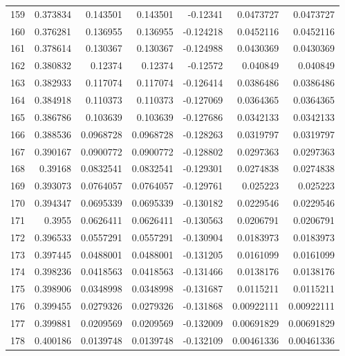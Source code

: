 \begin{tabular}{rrrrrrr}
 159 &  0.373834    & 0.143501    & 0.143501    & -0.12341     & 0.0473727   & 0.0473727   \\
 160 &  0.376281    & 0.136955    & 0.136955    & -0.124218    & 0.0452116   & 0.0452116   \\
 161 &  0.378614    & 0.130367    & 0.130367    & -0.124988    & 0.0430369   & 0.0430369   \\
 162 &  0.380832    & 0.12374     & 0.12374     & -0.12572     & 0.040849    & 0.040849    \\
 163 &  0.382933    & 0.117074    & 0.117074    & -0.126414    & 0.0386486   & 0.0386486   \\
 164 &  0.384918    & 0.110373    & 0.110373    & -0.127069    & 0.0364365   & 0.0364365   \\
 165 &  0.386786    & 0.103639    & 0.103639    & -0.127686    & 0.0342133   & 0.0342133   \\
 166 &  0.388536    & 0.0968728   & 0.0968728   & -0.128263    & 0.0319797   & 0.0319797   \\
 167 &  0.390167    & 0.0900772   & 0.0900772   & -0.128802    & 0.0297363   & 0.0297363   \\
 168 &  0.39168     & 0.0832541   & 0.0832541   & -0.129301    & 0.0274838   & 0.0274838   \\
 169 &  0.393073    & 0.0764057   & 0.0764057   & -0.129761    & 0.025223    & 0.025223    \\
 170 &  0.394347    & 0.0695339   & 0.0695339   & -0.130182    & 0.0229546   & 0.0229546   \\
 171 &  0.3955      & 0.0626411   & 0.0626411   & -0.130563    & 0.0206791   & 0.0206791   \\
 172 &  0.396533    & 0.0557291   & 0.0557291   & -0.130904    & 0.0183973   & 0.0183973   \\
 173 &  0.397445    & 0.0488001   & 0.0488001   & -0.131205    & 0.0161099   & 0.0161099   \\
 174 &  0.398236    & 0.0418563   & 0.0418563   & -0.131466    & 0.0138176   & 0.0138176   \\
 175 &  0.398906    & 0.0348998   & 0.0348998   & -0.131687    & 0.0115211   & 0.0115211   \\
 176 &  0.399455    & 0.0279326   & 0.0279326   & -0.131868    & 0.00922111  & 0.00922111  \\
 177 &  0.399881    & 0.0209569   & 0.0209569   & -0.132009    & 0.00691829  & 0.00691829  \\
 178 &  0.400186    & 0.0139748   & 0.0139748   & -0.132109    & 0.00461336  & 0.00461336  \\

\end{tabular}
